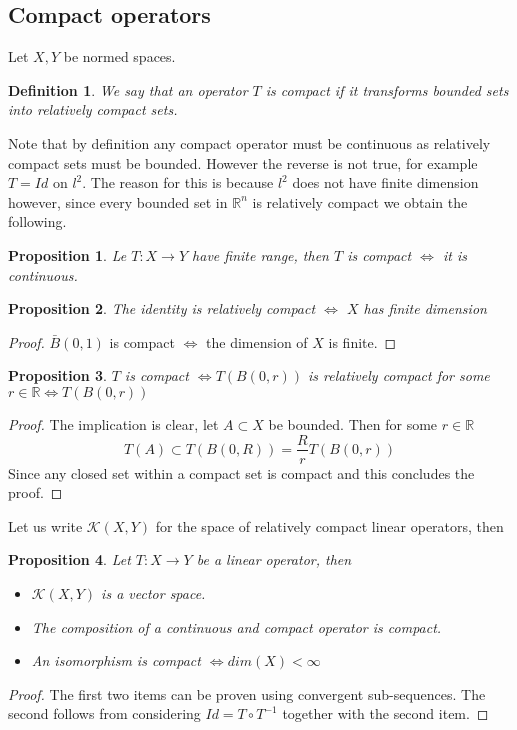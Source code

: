 \documentclass[12pt]{article}
\newcommand{\R}{{\mathbb R}}
\newtheorem{proposition}{Proposition}
\newtheorem{definition}{Definition}
\begin{document}
\subsection{Compact operators}
Let $X,Y$ be normed spaces.
\begin{definition}
	We say that an operator $T$ is compact if it transforms bounded sets into relatively compact sets.
\end{definition}
Note that by definition any compact operator must be continuous as relatively compact sets must be bounded. However the reverse is not true, for example $T=Id$ on $l^2$. The reason for this is because $l^2$ does not have finite dimension however, since every bounded set in $\R^n$ is relatively compact we obtain the following.
\begin{proposition}
	Le $T:X\to Y$ have finite range, then $T$ is compact $\iff$ it is continuous.
\end{proposition}
\begin{proposition}
	The identity is relatively compact $\iff$ $X$ has finite dimension
\end{proposition}
\begin{proof}
	$\bar{B}(0,1)$ is compact $\iff$ the dimension of $X$ is finite.
\end{proof}
\begin{proposition}
	$T$ is compact $\iff T(B(0,r))$ is relatively compact for some $r\in\R\iff T(B(0,r))$
\end{proposition}
\begin{proof}
	The implication is clear, let $A\subset X$ be bounded. Then for some $r\in\R$
	\begin{equation*}
		T(A)\subset T(B(0,R))=\frac{R}{r} T(B(0,r))
	\end{equation*}
	Since any closed set within a compact set is compact and this concludes the proof.
\end{proof}
Let us write $\mathcal{K}(X,Y)$ for the space of relatively compact linear operators, then
\begin{proposition}
	Let $T:X\to Y$ be a linear operator, then
	\begin{itemize}
		\item $\mathcal{K}(X,Y)$ is a vector space.
		\item The composition of a continuous and compact operator is compact.
		\item An isomorphism is compact $\iff dim(X)<\infty$
	\end{itemize}
\end{proposition}
\begin{proof}
	The first two items can be proven using convergent sub-sequences. The second follows from considering $Id=T\circ T^{-1}$ together with the second item.
\end{proof}
\end{document}
